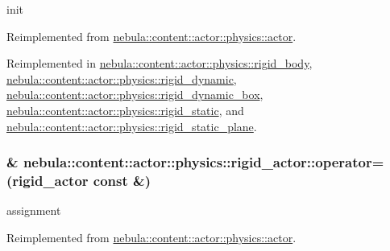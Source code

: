 init 

Reimplemented from \hyperlink{classnebula_1_1content_1_1actor_1_1physics_1_1actor_a7ab3552a370009bff858cbff7245bc9c}{nebula::content::actor::physics::actor}.

Reimplemented in \hyperlink{classnebula_1_1content_1_1actor_1_1physics_1_1rigid__body_a858ee11f899acf3cc8f94eccf5713384}{nebula::content::actor::physics::rigid\_\-body}, \hyperlink{classnebula_1_1content_1_1actor_1_1physics_1_1rigid__dynamic_ae9450372c5f60103573ed626ffda9532}{nebula::content::actor::physics::rigid\_\-dynamic}, \hyperlink{classnebula_1_1content_1_1actor_1_1physics_1_1rigid__dynamic__box_a235e20a7e695a39c7ccb0100b90c10ee}{nebula::content::actor::physics::rigid\_\-dynamic\_\-box}, \hyperlink{classnebula_1_1content_1_1actor_1_1physics_1_1rigid__static_a37aa702d9a31ff9529659343c6155482}{nebula::content::actor::physics::rigid\_\-static}, and \hyperlink{classnebula_1_1content_1_1actor_1_1physics_1_1rigid__static__plane_ae7e418de928a5830a9e088bb843c95f0}{nebula::content::actor::physics::rigid\_\-static\_\-plane}.\hypertarget{classnebula_1_1content_1_1actor_1_1physics_1_1rigid__actor_aa3d6e979793753e37b9b95b118e40c67}{
\subsubsection[{operator=}]{\& nebula::content::actor::physics::rigid\_\-actor::operator= ({\bf rigid\_\-actor} const \&)}}
\label{classnebula_1_1content_1_1actor_1_1physics_1_1rigid__actor_aa3d6e979793753e37b9b95b118e40c67}


assignment 

Reimplemented from \hyperlink{classnebula_1_1content_1_1actor_1_1physics_1_1actor_abdcf4fcfdf017e71cea08a8c0341a4c8}{nebula::content::actor::physics::actor}.

